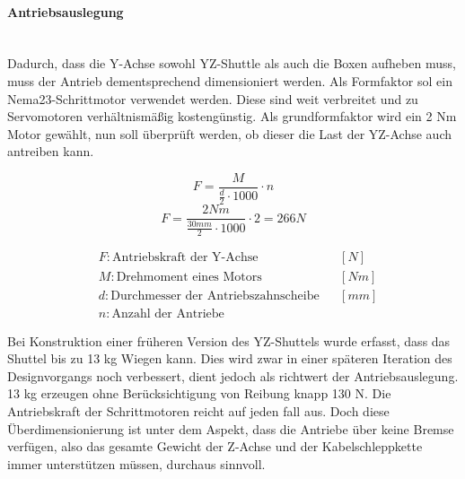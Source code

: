 \paragraph{Antriebsauslegung}\mbox{}\\
Dadurch, dass die Y-Achse sowohl YZ-Shuttle als auch die Boxen aufheben muss, muss der Antrieb dementsprechend dimensioniert werden. Als Formfaktor sol ein Nema23-Schrittmotor verwendet werden. Diese sind weit verbreitet und zu Servomotoren verhältnismäßig kostengünstig. Als grundformfaktor wird ein 2 Nm Motor gewählt, nun soll überprüft werden, ob dieser die Last der YZ-Achse auch antreiben kann.

\vspace{5mm}
\noindent\begin{minipage}{\textwidth}
\begin{minipage}[t]{0.5\textwidth}
    \begin{equation*}
        F = \frac{M}{\frac{d}{2} \cdot 1000} \cdot n
    \end{equation*}
    \begin{equation*}
        F = \frac{2 \unit{Nm}}{\frac{30 \unit{mm}}{2} \cdot 1000} \cdot 2 = 266 \unit{N}
    \end{equation*}
\end{minipage}%
\begin{minipage}[t]{0.4\textwidth}
    \vspace*{-5mm}
    \begin{align*}
        &F: \text{Antriebskraft der Y-Achse} & &\left[N\right]\\
        &M: \text{Drehmoment eines Motors} & &\left[Nm\right]\\
        &d: \text{Durchmesser der Antriebszahnscheibe} & &\left[mm\right]\\
        &n: \text{Anzahl der Antriebe} & &
    \end{align*}
\end{minipage}
\end{minipage}

\vspace{5mm}

Bei Konstruktion einer früheren Version des YZ-Shuttels wurde erfasst, dass das Shuttel bis zu 13 kg Wiegen kann. Dies wird zwar in einer späteren Iteration des Designvorgangs noch verbessert, dient jedoch als richtwert der Antriebsauslegung. 13 kg erzeugen ohne Berücksichtigung von Reibung knapp 130 N. Die Antriebskraft der Schrittmotoren reicht auf jeden fall aus. Doch diese Überdimensionierung ist unter dem Aspekt, dass die Antriebe über keine Bremse verfügen, also das gesamte Gewicht der Z-Achse und der Kabelschleppkette immer unterstützen müssen, durchaus sinnvoll.

